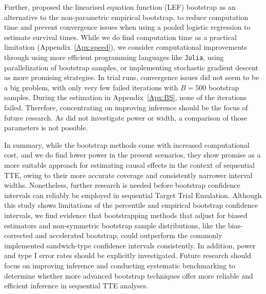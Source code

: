 \documentclass[pdflatex,sn-vancouver-ay]{sn-jnl}%
\theoremstyle{thmstyleone}%
\theoremstyle{thmstyletwo}%
\theoremstyle{thmstylethree}%
\newcommand{\julia}{\texttt{Julia}}
\begin{document}
Further, \cite{limozinInferenceProceduresSequential2024} proposed the linearised equation function (LEF) bootstrap as an alternative to the non-parametric empirical bootstrap, to reduce computation time and prevent convergence issues when using a pooled logistic regression to estimate survival times. While we do find computation time as a practical limitation (Appendix~\ref{Apx:speed}), we consider computational improvements through using more efficient programming languages like \julia{}, using parallelization of bootstrap samples, or implementing stochastic gradient descent \citep{christmannBootstrapSGDAlgorithmic2024} as more promising strategies. In trial runs, convergence issues did not seem to be a big problem, with only very few failed iterations with $B = 500$ bootstrap samples. During the estimation in Appendix~\ref{Apx:BS}, none of the iterations failed. Therefore, concentrating on improving inference should be the focus of future research. As \cite{limozinInferenceProceduresSequential2024} did not investigate power or width, a comparison of those parameters is not possible.

In summary, while the bootstrap methods come with increased computational cost, and we do find lower power in the present scenarios, they show promise as a more suitable approach for estimating causal effects in the context of sequential TTE, owing to their more accurate coverage and consistently narrower interval widths. Nonetheless, further research is needed before bootstrap confidence intervals can reliably be employed in sequential Target Trial Emulation. Although this study shows limitations of the percentile and empirical bootstrap confidence intervals, we find evidence that bootstrapping methods that adjust for biased estimators and non-symmetric bootstrap sample distributions, like the bias-corrected and accelerated bootstrap, could outperform the commonly implemented sandwich-type confidence intervals consistently. In addition, power and type I error rates should be explicitly investigated. Future research should focus on improving inference and conducting systematic benchmarking to determine whether more advanced bootstrap techniques offer more reliable and efficient inference in sequential TTE analyses.


\pagebreak


\pagebreak
\end{document}
